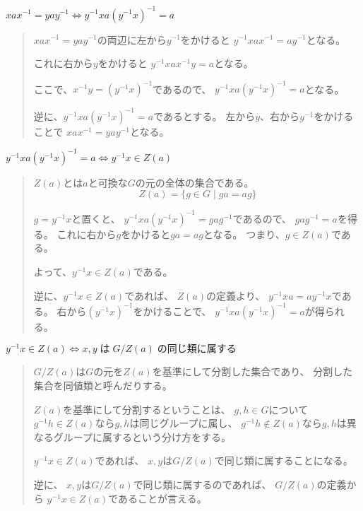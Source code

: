 \documentclass[12pt,b5paper]{ltjsarticle}
\begin{document}
$xax^{-1} = yay^{-1} \Longleftrightarrow y^{-1}xa(y^{-1}x)^{-1} = a$
\begin{quote}
 $xax^{-1} = yay^{-1}$の両辺に左から$y^{-1}$をかけると
 $y^{-1}xax^{-1} = ay^{-1}$となる。

 これに右から$y$をかけると
 $y^{-1}xax^{-1}y = a$となる。

 ここで、$x^{-1}y = (y^{-1}x)^{-1}$であるので、
 $y^{-1}xa(y^{-1}x)^{-1} = a$となる。

 逆に、$y^{-1}xa(y^{-1}x)^{-1} = a$であるとする。
 左から$y$、右から$y^{-1}$をかけることで
 $xax^{-1} = yay^{-1}$となる。
\end{quote}

$y^{-1}xa(y^{-1}x)^{-1} = a \Longleftrightarrow y^{-1}x \in Z(a)$
\begin{quote}
 $Z(a)$とは$a$と可換な$G$の元の全体の集合である。
 \begin{equation}
  Z(a) = \{ g\in G \mid ga=ag\}
 \end{equation}

 $g=y^{-1}x$と置くと、
 $y^{-1}xa(y^{-1}x)^{-1} = gag^{-1}$であるので、
 $gag^{-1}=a$を得る。
 これに右から$g$をかけると$ga=ag$となる。
 つまり、$g\in Z(a)$である。

 よって、$y^{-1}x \in Z(a)$である。

 逆に、$y^{-1}x \in Z(a)$であれば、
 $Z(a)$の定義より、
 $y^{-1}xa = ay^{-1}x$である。
 右から$(y^{-1}x)^{-1}$をかけることで、
 $y^{-1}xa(y^{-1}x)^{-1} = a$が得られる。
\end{quote}

$y^{-1}x \in Z(a) \Longleftrightarrow x,y \; は \; G/Z(a) \; の同じ類に属する$
\begin{quote}
 $G/Z(a)$は$G$の元を$Z(a)$を基準にして分割した集合であり、
 分割した集合を同値類と呼んだりする。

 $Z(a)$を基準にして分割するということは、
 $g,h\in G$について$g^{-1}h \in Z(a)$なら$g,h$は同じグループに属し、
 $g^{-1}h\not\in Z(a)$なら$g,h$は異なるグループに属するという分け方をする。

 $y^{-1}x \in Z(a)$であれば、
 $x,y$は$G/Z(a)$で同じ類に属することになる。

 逆に、
 $x,y$は$G/Z(a)$で同じ類に属するのであれば、
 $G/Z(a)$の定義から
 $y^{-1}x \in Z(a)$であることが言える。
\end{quote}

\hrulefill
\end{document}
